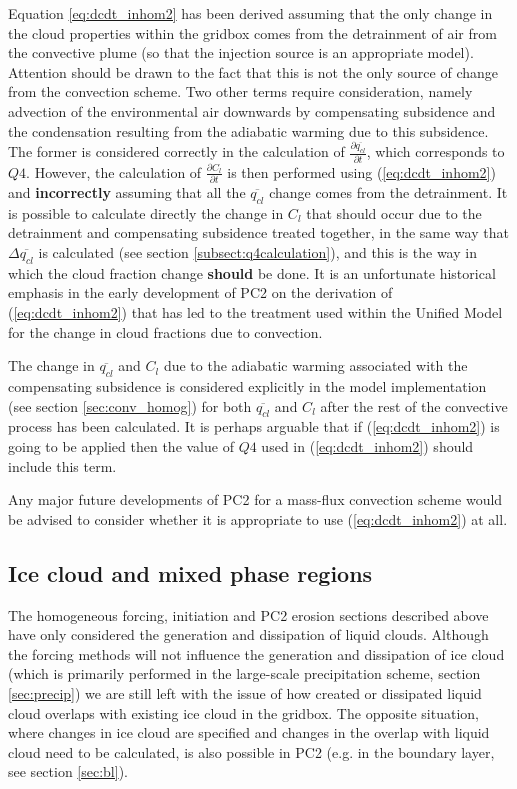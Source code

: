 \documentclass{UMDP_article}
\begin{document}
Equation \ref{eq:dcdt_inhom2} has been derived assuming that the
only change in the cloud properties within the gridbox comes from
the detrainment of air from the convective plume (so that the injection
source is an appropriate model). Attention should be drawn to the fact
that this is not the only source of change from the convection scheme.
Two other terms require consideration, namely advection of the environmental
air downwards by compensating subsidence and the condensation resulting
from the adiabatic warming due to this subsidence. 
The former is considered correctly in the calculation of
$\frac{\partial \overline{q_{cl}}}{\partial t}$, which corresponds to $Q4$.
However, the calculation of $\frac{\partial C_l}{\partial t}$
is then performed using (\ref{eq:dcdt_inhom2}) and \textbf{incorrectly} assuming
that all the $\overline{q_{cl}}$ change comes from the detrainment. It is
possible to calculate directly the change in $C_l$ that should occur due to
the detrainment and compensating subsidence treated together, in the same way
that $\Delta \overline{q_{cl}}$ is calculated (see section
\ref{subsect:q4calculation}), and this is the way in which the cloud fraction
change \textbf{should} be done.
It is an unfortunate historical emphasis in the early development of PC2
on the derivation of (\ref{eq:dcdt_inhom2}) that has led to the treatment
used within the Unified Model for the change in cloud fractions due to convection.

The change in $\overline{q_{cl}}$ and $C_l$ due to the adiabatic warming
associated with the compensating subsidence is considered explicitly
in the model implementation (see
section \ref{sec:conv_homog}) for both $\overline{q_{cl}}$ and $C_l$
after the rest of the convective process has been calculated. It is perhaps
arguable that if (\ref{eq:dcdt_inhom2}) is going to be applied then
the value of $Q4$ used in (\ref{eq:dcdt_inhom2}) should include this term.

Any major future developments of PC2 for a mass-flux convection scheme would be
advised to consider whether it is appropriate to use (\ref{eq:dcdt_inhom2}) at
all.

\subsection{Ice cloud and mixed phase regions}
\label{sec:ct}

The homogeneous forcing, initiation and PC2 erosion sections described
above have only considered the generation and dissipation of liquid
clouds. Although the forcing methods will not influence the generation
and dissipation of ice cloud (which is primarily performed in the
large-scale precipitation scheme, section \ref{sec:precip}) we
are still left with the issue of how created or dissipated liquid
cloud overlaps with existing ice cloud in the gridbox. The
opposite situation, where changes in ice cloud are specified
and changes in the overlap with liquid cloud need to be calculated,
is also possible in PC2 (e.g. in the boundary layer, see
section \ref{sec:bl}).
\end{document}
